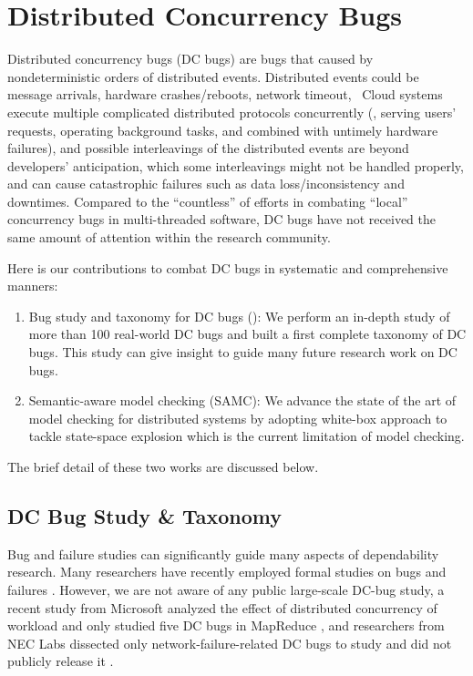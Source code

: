 \section{Distributed Concurrency Bugs}

Distributed concurrency bugs (DC bugs) are bugs that caused by nondeterministic
orders of distributed events. Distributed events could be message arrivals,
hardware crashes/reboots, network timeout, \etc\ Cloud systems execute multiple
complicated distributed protocols concurrently (\eg, serving users' requests,
operating background tasks, and combined with untimely hardware failures), and
possible interleavings of the distributed events are beyond developers'
anticipation, which some interleavings might not be handled properly, and can
cause catastrophic failures such as data loss/inconsistency and downtimes.
Compared to the ``countless'' of efforts in combating ``local'' concurrency bugs
in multi-threaded software, DC bugs have not received the same amount of
attention within the research community.

Here is our contributions to combat DC bugs in systematic and comprehensive manners:

\begin{enumerate}

\item Bug study and taxonomy for DC bugs (\taxdc): We perform an in-depth study
of more than 100 real-world DC bugs and built a first complete taxonomy of DC
bugs. This study can give insight to guide many future research work on DC
bugs.

\item Semantic-aware model checking (SAMC): We advance the state of the art of
model checking for distributed systems by adopting white-box approach to tackle
state-space explosion which is the current limitation of model checking.

\end{enumerate}

The brief detail of these two works are discussed below.

\subsection{DC Bug Study \& Taxonomy}

Bug and failure studies can significantly guide many aspects of dependability
research. Many researchers have recently employed formal studies on bugs and
failures \cite{Jin+12-PerformanceBugs, Li+13-ScopeBugStudy, Li+07-MemoryErrors,
Lu+08-ConcurrencyBugStudy, Sahoo+10-StudyBugsServerSoftware,
SridharanLiberty12-StudyDRAMFailures, Xiao+14-NonDetMR,
Yin+11-StudyConfErrors}.
%
However, we are not aware of any public large-scale DC-bug study, a recent study
from Microsoft analyzed the effect of distributed concurrency of workload and
only studied five DC bugs in MapReduce \cite{Xiao+14-NonDetMR}, and researchers
from NEC Labs dissected only network-failure-related DC bugs to study and did
not publicly release it \cite{Joshi+13-SetsudoTesting}.

